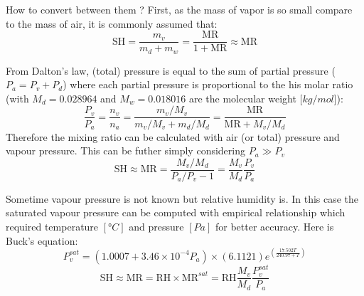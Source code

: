 \documentclass[11pt,a4paper]{report}
\begin{document}
 How to convert between them ? 
First, as the mass of vapor is so small compare to the mass of air, it is commonly assumed that:
\begin{equation}
\mathrm{SH} = \frac{m_v}{m_d +m_w} = \frac{\mathrm{MR}}{1+\mathrm{MR}} \approx \mathrm{MR}
\end{equation}

 From Dalton's law, (total) pressure is equal to the sum of partial pressure ($P_a=P_v+P_d$) where each partial pressure is proportional to the his molar ratio (with $M_d = 0.028964$ and $M_w=0.018016$ are the molecular weight [$kg/mol$]):
 \begin{equation}
 \frac{P_v}{P_a}=\frac{n_v}{n_a}=\frac{m_v/M_v}{m_v/M_v + m_d/M_d}=\frac{\mathrm{MR}}{{\mathrm{MR}}+M_v/M_d}
 \end{equation} 
 Therefore the mixing ratio can be calculated with air (or total) pressure and vapour pressure. This can be futher simply considering $P_a\gg P_v$
\begin{equation}
\mathrm{SH} \approx \mathrm{MR} = \frac{M_v/M_d}{P_a/P_v -1}=\frac{M_v}{M_d}\frac{P_v}{P_a}
\end{equation}

Sometime vapour pressure is not known but relative humidity is. In this case the saturated vapour pressure can be computed with empirical relationship which required temperature $[°C]$ and pressure $[Pa]$ for better accuracy. Here is Buck's equation:
\begin{equation}
P_v^{sat} = (1.0007 + 3.46 \times 10^{-4}  P_a) \times (6.1121) e^{\left(\frac {17.502 T} {240.97 + T}\right)}
\end{equation}
\begin{equation}
\mathrm{SH} \approx \mathrm{MR} =\mathrm{RH} \times \mathrm{MR}^{sat} = \mathrm{RH} \frac{M_v}{M_d}\frac{P_v^{sat}}{P_a}
\end{equation}
\end{document}
